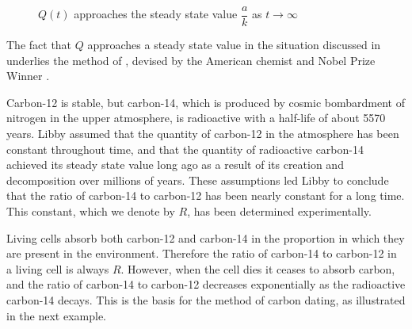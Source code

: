 \begin{alistSolution}
\begin{figure}
  \centering
\caption{$Q(t)$ approaches the steady state value
$\dfrac{a}{k}$ as $t\to\infty$}
  \label{figure:4.1.3}
\end{figure}

\end{alistSolution}



The fact that $Q$ approaches a steady state value in the
situation discussed in  underlies the method of 
, devised by  the American chemist and Nobel Prize Winner
.

Carbon-12 is stable, but carbon-14, which is produced by cosmic
bombardment of nitrogen in the upper atmosphere, is radioactive with a
half-life of about 5570 years. Libby assumed that the
quantity
of carbon-12 in the atmosphere has been constant throughout time, and
that the quantity of radioactive carbon-14 achieved its steady state
value long ago as a result of its creation and decomposition over
millions of years. These assumptions led Libby to conclude that the
ratio of carbon-14 to carbon-12 has been nearly constant for a long
time. This constant, which we denote by $R$, has been determined
experimentally.

Living cells absorb both carbon-12 and carbon-14 in the proportion in
which they are present in the environment. Therefore the ratio of
carbon-14 to carbon-12 in a living cell is always $R$. However, when
the cell dies it ceases to absorb carbon, and the ratio of carbon-14
to carbon-12 decreases exponentially as the radioactive carbon-14
decays. This is the basis for the method of carbon dating, as
illustrated in the next example.

